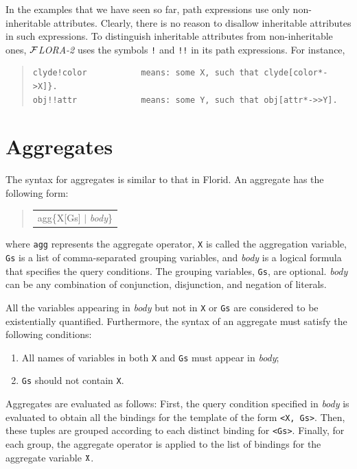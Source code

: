 \documentclass[11pt]{article}
\newenvironment{qrules}{\begin{quote}\tt\begin{tabular}[t]{l}}%
{\end{tabular}\end{quote}}
\newcommand{\FLORA}{{\mbox{${\cal F}${\small\it LORA}\rm\emph{-2}}}\xspace}
\newcommand{\FLORID}{{\mbox{\sc Florid}}\xspace}
\begin{document}
In the examples that we have seen so far, path expressions use only
non-inheritable attributes. Clearly, there is no reason to disallow
inheritable attributes in such expressions. To distinguish inheritable
attributes from non-inheritable ones, \FLORA uses the symbols
{\tt !} and {\tt !!} in its path expressions. For instance,
\begin{quote}
\begin{verbatim}
clyde!color           means: some X, such that clyde[color*->X]}.
obj!!attr             means: some Y, such that obj[attr*->>Y].
\end{verbatim}
\end{quote}



\section{Aggregates}


The syntax for aggregates is similar to that in \FLORID. An
aggregate has the following form:
\begin{qrules}
agg\{X[Gs] $|$ {\it body}\}
\end{qrules}
%
where {\tt agg} represents the aggregate operator, {\tt X} is called the
aggregation variable, {\tt Gs} is a list of comma-separated grouping
variables, and {\it body} is a logical formula that specifies the
query conditions. The grouping variables, {\tt Gs}, are optional. {\it body}
can be any combination of conjunction, disjunction, and negation of literals.

All the variables appearing in {\it body} but not in {\tt X} or {\tt Gs} are
considered to be existentially quantified. Furthermore, the syntax of an
aggregate must satisfy the following conditions:
\begin{enumerate}
\item All names of variables in both {\tt X} and {\tt Gs} must
appear in {\it body};
\item {\tt Gs} should not contain {\tt X}.
\end{enumerate}

Aggregates are evaluated as follows: First, the query
condition specified in {\it body} is evaluated to obtain all the bindings
for the template of the form {\tt \texttt{<}X, Gs\texttt{>}}. Then, these
tuples are grouped according to each distinct binding for
{\tt \texttt{<}Gs\texttt{>}}. Finally, for each group, the aggregate operator
is applied to the list of bindings for the aggregate variable $\tt X$.
\end{document}
